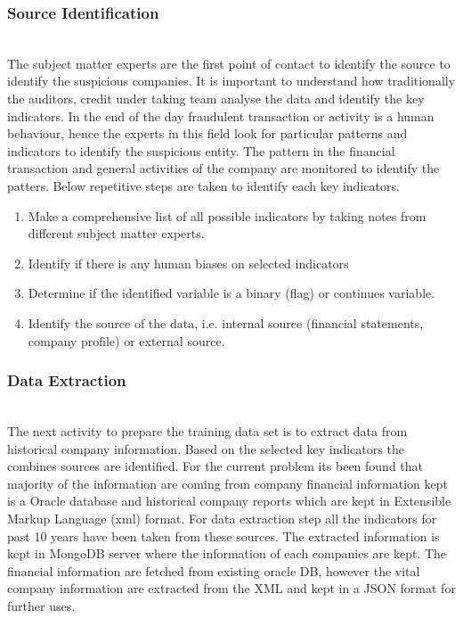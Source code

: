 \subsubsection{Source Identification}\hspace*{\fill} \\
The subject matter experts are the first point of contact to identify the source to identify the suspicious companies. It is important to understand how traditionally the auditors, credit under taking team analyse the data and identify the key indicators. In the end of the day fraudulent transaction or activity is a human behaviour, hence the experts in this field look for particular patterns and indicators to identify the suspicious entity. The pattern in the financial transaction and general activities of the company are monitored to identify the patters. Below repetitive steps are taken to identify each key indicators.

\begin{enumerate}
    \item Make a comprehensive list of all possible indicators by taking notes from different subject matter experts. 
    \item Identify if there is any human biases on selected indicators  
    \item Determine if the identified variable is a binary (flag) or continues variable. 
    \item Identify the source of the data, i.e. internal source (financial statements, company profile) or external source. 
\end{enumerate}
\subsubsection{Data Extraction}\hspace*{\fill} \\
The next activity to prepare the training data set is to extract data from historical company information. Based on the selected key indicators the combines sources are identified. For the current problem its been found that majority of the information are coming from company financial information kept is a Oracle database and historical company reports which are kept in Extensible Markup Language (xml) format. For data extraction step all the indicators for past 10 years have been taken from these sources. The extracted information is kept in MongoDB server where the information of each companies are kept. The financial information are fetched from existing oracle DB, however the vital company information are extracted from the XML and kept in a JSON  format for further uses. 

